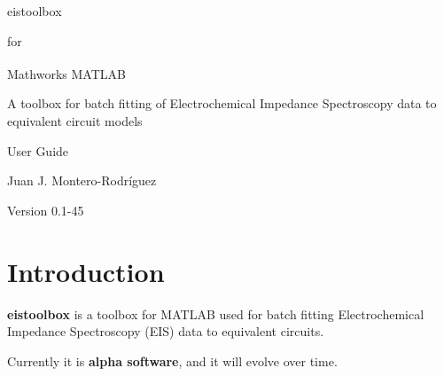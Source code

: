 \documentclass[10pt,a4paper,oneside]{memoir}
\begin{document}
\setlength{\parindent}{0pt}
\setlength{\parskip}{6pt}


 \vspace*{3cm}
	
 \begin{center}
 	\HUGE eistoolbox \par
 \end{center}
 \begin{center}
 	\LARGE for \par
 \end{center}
 \begin{center}
 	\HUGE Mathworks\textsuperscript{\textregistered} MATLAB \par
 \end{center}
 
 \vspace*{2cm}
 
\begin{center}
	\Large A toolbox for batch fitting of Electrochemical Impedance Spectroscopy data to equivalent circuit models
\end{center} 
 
 \vspace*{2cm}
 
 \begin{center}
 	\Huge User Guide \par
 \end{center}
 \begin{center}
 	\LARGE Juan J. Montero-Rodríguez \par
 \end{center}
 
 \vspace*{4cm}
 
 \begin{center}
 	\Large Version 0.1-45
 \end{center}

\clearpage




\tableofcontents



\chapter{Introduction}

\textbf{eistoolbox} is a toolbox for MATLAB\textregistered{} used for batch fitting Electrochemical Impedance Spectroscopy (EIS) data to equivalent circuits. 

Currently it is \textbf{alpha software}, and it will evolve over time.
\end{document}
